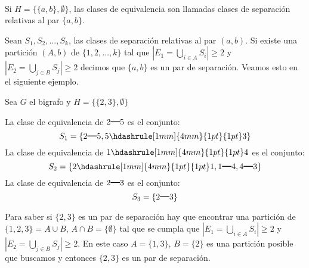 \paragraph{}
Si $H = \{\{a, b\}, \emptyset \}$, las clases de equivalencia son llamadas clases de separación relativas al par $\{a, b\}$.
\begin{definition}
Sean $S_{1}, S_{2}, \ldots, S_{k}$, las clases de separación relativas al par $\left(a, b\right)$. Si existe una partición $\left(A, b\right)$ de $\{1, 2, \ldots, k\}$ tal que $\left| E_{1} = \bigcup_{i \in A} S_{i}\right| \geq 2$ y $\left|E_{2} = \bigcup_{j \in B} S_{j}\right| \geq 2$ decimos que $\{a, b\}$ es un par de separación. Veamos esto en el siguiente ejemplo.
\end{definition}

\begin{example}
Sea $G$ el bigrafo y $H=\{\{2, 3\},  \emptyset\}$
  \centering
\end{example}

La clase de equivalencia de $2\rule[1mm]{4mm}{0.3mm}5$ es el conjunto:
$$S_{1} = \{2\rule[1mm]{4mm}{0.3mm}5, 5 \hdashrule[1mm]{4mm}{1pt}{1pt} 3\}$$
La clase de equivalencia de $1\hdashrule[1mm]{4mm}{1pt}{1pt} 4$ es el conjunto:
$$S_{2} = \{2 \hdashrule[1mm]{4mm}{1pt}{1pt} 1, 1\rule[1mm]{4mm}{0.3mm}4, 4\rule[1mm]{4mm}{0.3mm}3\}$$
La clase de equivalencia de $2\rule[1mm]{4mm}{0.3mm}3$ es el conjunto:
$$S_{3} = \{2\rule[1mm]{4mm}{0.3mm}3\}$$

Para saber si $\{2,3\}$ es un par de separación hay que encontrar una partición de $\{1, 2, 3\} = A \cup B$, $A \cap B = \{\emptyset\}$ tal que se cumpla que $|E_{1} = \bigcup_{i \in A} S_i| \geq 2$ y $ |E_{2}= \bigcup_{j \in B} S_j| \geq 2$.
En este caso $A = \{1, 3\}$, $B=\{2\}$ es una partición posible que buscamos y entonces $\{2, 3\}$ es un par de separación.\\

